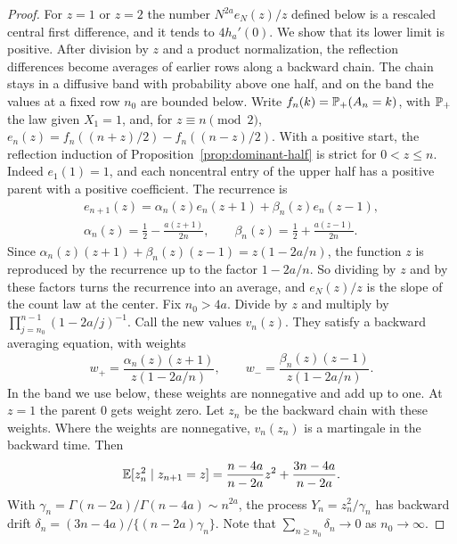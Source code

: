 \begin{proof}
For $z=1$ or $z=2$ the number $N^{2a}e_N(z)/z$ defined below is a
rescaled central first difference, and it tends to $4h_a'(0)$. We show
that its lower limit is positive. After division by $z$ and a product
normalization, the reflection differences become averages of earlier
rows along a backward chain. The chain stays in a diffusive band with
probability above one half, and on the band the values at a fixed row
$n_0$ are bounded below. Write $f_n(k)=\mathbb{P}_+(A_n=k)$, with $\mathbb{P}_+$ the law given $X_1=1$, and,
for $z\equiv n\pmod2$,
$e_n(z)=f_n((n+z)/2)-f_n((n-z)/2)$.
With a positive start, the reflection induction of
Proposition~\ref{prop:dominant-half} is strict for $0<z\le n$. Indeed
$e_1(1)=1$, and each noncentral entry of the upper half has a
positive parent with a positive coefficient. The recurrence is
\begin{gather*}
 e_{n+1}(z)=\alpha_n(z)e_n(z+1)+\beta_n(z)e_n(z-1),\\
 \alpha_n(z)=\frac12-\frac{a(z+1)}{2n},\qquad
 \beta_n(z)=\frac12+\frac{a(z-1)}{2n}.
\end{gather*}
Since $\alpha_n(z)(z+1)+\beta_n(z)(z-1)=z(1-2a/n)$, the function $z$
is reproduced by the recurrence up to the factor $1-2a/n$. So dividing
by $z$ and by these factors turns the recurrence into an average, and
$e_N(z)/z$ is the slope of the count law at the center.
Fix $n_0>4a$. Divide by $z$ and multiply by
$\prod_{j=n_0}^{n-1}(1-2a/j)^{-1}$. Call the new values $v_n(z)$.
They satisfy a backward averaging equation, with weights
\[
 w_+=\frac{\alpha_n(z)(z+1)}{z(1-2a/n)},\qquad
 w_-=\frac{\beta_n(z)(z-1)}{z(1-2a/n)}.
\]
In the band we use below, these weights are nonnegative and add up to
one. At $z=1$ the parent $0$ gets weight zero. Let $z_n$ be the
backward chain with these weights. Where the weights are nonnegative,
$v_n(z_n)$ is a martingale in the backward time. Then
\[
 \mathbb{E}[z_n^2\mid z_{n+1}=z]
 =\frac{n-4a}{n-2a}z^2+\frac{3n-4a}{n-2a}.
\]
With $\gamma_n=\Gamma(n-2a)/\Gamma(n-4a)\sim n^{2a}$, the process
$Y_n=z_n^2/\gamma_n$ has backward drift
$\delta_n=(3n-4a)/\{(n-2a)\gamma_n\}$. Note that
$\sum_{n\ge n_0}\delta_n\to0$ as $n_0\to\infty$.


\end{proof}

